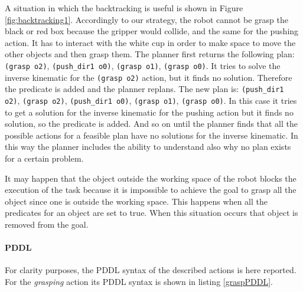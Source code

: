 A situation in which the backtracking is useful is shown in Figure \ref{fig:backtracking1}. Accordingly to our strategy, the robot cannot be grasp the black or red box because the gripper would collide, and the same for the pushing action. It has to interact with the white cup in order to make space to move the other objects and then grasp them. The planner first returns the following plan: \texttt{(grasp o2)}, \texttt{(push\_dir1 o0)}, \texttt{(grasp o1)}, \texttt{(grasp o0)}. It tries to solve the inverse kinematic for the \texttt{(grasp o2)} action, but it finds no solution. Therefore the predicate  is added and the planner replans. The new plan is: \texttt{(push\_dir1 o2)}, \texttt{(grasp o2)}, \texttt{(push\_dir1 o0)}, \texttt{(grasp o1)}, \texttt{(grasp o0)}. In this case it tries to get a solution for the inverse kinematic for the pushing action but it finds no solution, so the predicate  is added. And so on until the planner finds that all the possible actions for a feasible plan have no solutions for the inverse kinematic. In this way the planner includes the ability to understand also why no plan exists for a certain problem. 

It may happen that the object outside the working space of the robot blocks the execution of the task because it is impossible to achieve the goal to grasp all the object since one is outside the working space.
This happens when all the  predicates for an object are set to true. When this situation occurs that object is removed from the goal.

\paragraph{PDDL}
For clarity purposes, the PDDL syntax of the described actions is here reported. 
For the \textit{grasping} action its PDDL syntax is shown in listing \ref{graspPDDL}.

